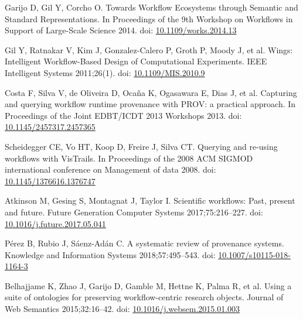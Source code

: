 \documentclass[10pt,letterpaper]{article}
\begin{document}
\begin{thebibliography}{10}
\begin{small}

Garijo D, Gil Y, Corcho O.
Towards Workflow Ecosystems through Semantic and Standard Representations.
In Proceedings of the 9th Workshop on Workflows in Support of Large-Scale Science 2014.
doi: \href{https://doi.org/10.1109/works.2014.13}{10.1109/works.2014.13}

Gil Y, Ratnakar V, Kim J, Gonzalez-Calero P, Groth P, Moody J, et al.
Wings: Intelligent Workflow-Based Design of Computational Experiments.
IEEE Intelligent Systems 2011;26(1).
doi: \href{https://doi.org/10.1109/MIS.2010.9}{10.1109/MIS.2010.9}

Costa F, Silva V, de Oliveira D, Ocaña K, Ogasawara E, Dias J, et al.
Capturing and querying workflow runtime provenance with PROV: a practical approach.
In Proceedings of the Joint EDBT/ICDT 2013 Workshops 2013.
doi: \href{https://doi.org/10.1145/2457317.2457365}{10.1145/2457317.2457365}

Scheidegger CE, Vo HT, Koop D, Freire J, Silva CT.
Querying and re-using workflows with VisTrails.
In Proceedings of the 2008 ACM SIGMOD international conference on Management of data 2008.
doi: \href{https://doi.org/10.1145/1376616.1376747}{10.1145/1376616.1376747}

Atkinson M, Gesing S, Montagnat J, Taylor I.
Scientific workflows: Past, present and future.
Future Generation Computer Systems 2017;75:216--227.
doi: \href{https://doi.org/10.1016/j.future.2017.05.041}{10.1016/j.future.2017.05.041}

Pérez B, Rubio J, Sáenz-Adán C.
A systematic review of provenance systems.
Knowledge and Information Systems 2018;57:495--543.
doi: \href{https://doi.org/10.1007/s10115-018-1164-3}{10.1007/s10115-018-1164-3}

Belhajjame K, Zhao J, Garijo D, Gamble M, Hettne K, Palma R, et al.
Using a suite of ontologies for preserving workflow-centric research objects.
Journal of Web Semantics 2015;32:16--42.
doi: \href{https://doi.org/10.1016/j.websem.2015.01.003}{10.1016/j.websem.2015.01.003}


\end{small}
\end{thebibliography}
\end{document}
